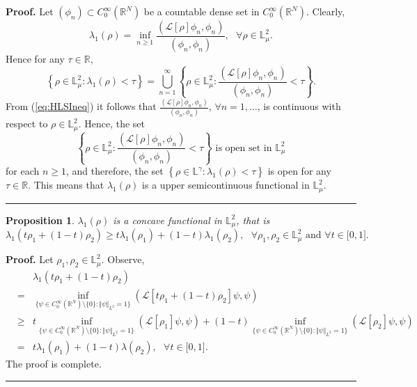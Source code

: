 \documentclass[12pt,thmsa]{article}
\newtheorem{proposition}[theorem]{Proposition}
\newenvironment{proof}[1][Proof]{\noindent\textbf{#1.} }{\ \rule{0.5em}{0.5em}}
\begin{document}
\begin{proof}
Let $(\phi _{n})\subset C_{0}^{\infty }(\mathbb{R}^{N})$ be a countable
dense set in $C_{0}^{\infty }(\mathbb{R}^{N})$. Clearly,
\begin{equation*}
\lambda _{1}(\rho )=\inf_{n\geq 1}\frac{(\mathcal{L}[\rho ]\phi _{n},\phi
_{n})}{(\phi _{n},\phi _{n})},\text{ }\forall \rho \in \mathbb{L}_{\mu }^{2}.
\end{equation*}%
Hence for any $\tau \in \mathbb{R}$,
\begin{equation*}
\left\{ \rho \in \mathbb{L}_{\mu }^{2}:\lambda _{1}(\rho )<\tau \right\}
=\bigcup_{n=1}^{\infty }\left\{ \rho \in \mathbb{L}_{\mu }^{2}:\frac{(%
\mathcal{L}[\rho ]\phi _{n},\phi _{n})}{(\phi _{n},\phi _{n})}<\tau \right\}
.
\end{equation*}%
From (\ref{eq:HLSIneq}) it follows that ${\frac{(\mathcal{L}[\rho ]\phi
_{n},\phi _{n})}{(\phi _{n},\phi _{n})}}$, $\forall n=1,\ldots $, is
continuous with respect to $\rho \in \mathbb{L}_{\mu }^{2}$. Hence, the set
\begin{equation*}
\left\{ \rho \in \mathbb{L}_{\mu }^{2}:\frac{(\mathcal{L}[\rho ]\phi
_{n},\phi _{n})}{(\phi _{n},\phi _{n})}<\tau \right\} \text{ is open set in }%
\mathbb{L}_{\mu }^{2}
\end{equation*}%
for each $n\geq 1$, and therefore, the set $\left\{ \rho \in \mathbb{L}%
^{\gamma }:\lambda _{1}(\rho )<\tau \right\} $ is open for any $\tau \in
\mathbb{R}$. This means that $\lambda _{1}(\rho )$ is a upper semicontinuous
functional in $\mathbb{L}_{\mu }^{2}$.
\end{proof}

\begin{proposition}
\label{prop23} \label{prop1} $\lambda _{1}(\rho )$ is a concave functional
in $\mathbb{L}_{\mu }^{2}$, that is
\begin{equation*}
\lambda _{1}(t\rho _{1}+(1-t)\rho _{2})\geq t\lambda _{1}(\rho
_{1})+(1-t)\lambda _{1}(\rho _{2}),\text{ }\forall \rho _{1},\rho _{2}\in
\mathbb{L}_{\mu }^{2}\text{ and }\forall t\in \lbrack 0,1].
\end{equation*}
\end{proposition}

\begin{proof}
Let $\rho _{1},\rho _{2}\in \mathbb{L}_{\mu }^{2}$. Observe,
\begin{eqnarray*}
&&\lambda _{1}(t\rho _{1}+(1-t)\rho _{2}) \\
&=&\inf_{\{\psi \in C_{0}^{\infty }(\mathbb{R}^{N})\setminus \{0\}:\Vert
\psi \Vert _{L^{2}}=1\}}(\mathcal{L}[t\rho _{1}+(1-t)\rho _{2}]\psi ,\psi )
\\
&\geq &t\inf_{\{\psi \in C_{0}^{\infty }(\mathbb{R}^{N})\setminus
\{0\}:\Vert \psi \Vert _{L^{2}}=1\}}(\mathcal{L}[\rho _{1}]\psi ,\psi
)+(1-t)\inf_{\{\psi \in C_{0}^{\infty }(\mathbb{R}^{N})\setminus \{0\}:\Vert
\psi \Vert _{L^{2}}=1\}}(\mathcal{L}[\rho _{2}]\psi ,\psi ) \\
&=&t\lambda _{1}(\rho _{1})+(1-t)\lambda (\rho _{2}),\text{ }\forall t\in
\lbrack 0,1].
\end{eqnarray*}%
The proof is complete.
\end{proof}
\end{document}
